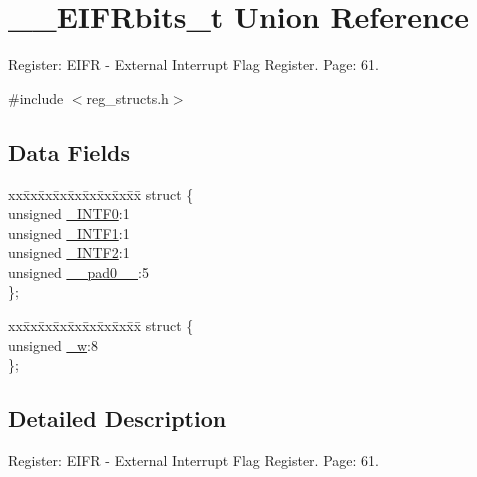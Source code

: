 \hypertarget{union_____e_i_f_rbits__t}{\section{\+\_\+\+\_\+\+E\+I\+F\+Rbits\+\_\+t Union Reference}
\label{union_____e_i_f_rbits__t}
}


Register\+: E\+I\+F\+R -\/ External Interrupt Flag Register. Page\+: 61.  




{\ttfamily \#include $<$reg\+\_\+structs.\+h$>$}

\subsection*{Data Fields}
\begin{DoxyCompactItemize}
\item 
\begin{tabbing}
xx\=xx\=xx\=xx\=xx\=xx\=xx\=xx\=xx\=\kill
struct \{\\
\>unsigned \hyperlink{union_____e_i_f_rbits__t_a911c8e8e206c1eb8b9bc62e55c6a8775}{\_INTF0}:1\\
\>unsigned \hyperlink{union_____e_i_f_rbits__t_aa5f09f22c6f0d41fc88cfb0659f348a4}{\_INTF1}:1\\
\>unsigned \hyperlink{union_____e_i_f_rbits__t_a8a9f600ec51872aac52fce7b110257a5}{\_INTF2}:1\\
\>unsigned \hyperlink{union_____e_i_f_rbits__t_a53f49a1c827625f5ebefe9eba29e6289}{\_\_pad0\_\_}:5\\
\}; \\

\end{tabbing}\item 
\begin{tabbing}
xx\=xx\=xx\=xx\=xx\=xx\=xx\=xx\=xx\=\kill
struct \{\\
\>unsigned \hyperlink{union_____e_i_f_rbits__t_a451eaa80e8cb4d8d45a2b717b50b141f}{\_w}:8\\
\}; \\

\end{tabbing}\end{DoxyCompactItemize}


\subsection{Detailed Description}
Register\+: E\+I\+F\+R -\/ External Interrupt Flag Register. Page\+: 61. 

